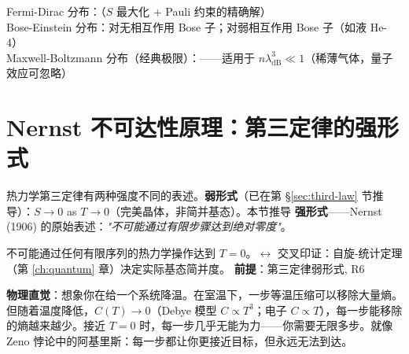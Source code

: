 \precisionbox[FD/BE 分布精度]
  Fermi-Dirac 分布：\precexact（$S$ 最大化 + Pauli 约束的精确解）\\
  Bose-Einstein 分布：\precexact 对无相互作用 Bose 子；\preceffective 对弱相互作用 Bose 子（如液 He-4）\\
  Maxwell-Boltzmann 分布（经典极限）：\precisionapprox——适用于 $n\lambda^3_{\text{dB}} \ll 1$（稀薄气体，量子效应可忽略）
\endprecisionbox

\section{Nernst 不可达性原理：第三定律的强形式}

热力学第三定律有两种强度不同的表述。\textbf{弱形式}（已在第 \S\ref{sec:third-law} 节推导）：$S \to 0$ as $T \to 0$（完美晶体，非简并基态）。本节推导 \textbf{强形式}——Nernst (1906) 的原始表述：\textit{"不可能通过有限步骤达到绝对零度"}。

\begin{lawbox}
  不可能通过任何有限序列的热力学操作达到 $T=0$。$\leftrightarrow$ 交叉印证：自旋-统计定理（第 \ref{ch:quantum} 章）决定实际基态简并度。
  \quad\textbf{前提}：第三定律弱形式, R6
\end{lawbox}

\noindent\textbf{物理直觉}：想象你在给一个系统降温。在室温下，一步等温压缩可以移除大量熵。但随着温度降低，$C(T) \to 0$（Debye 模型 $C \propto T^3$；电子 $C \propto T$），每一步能移除的熵越来越少。接近 $T=0$ 时，每一步几乎无能为力——你需要无限多步。就像 Zeno 悖论中的阿基里斯：每一步都让你更接近目标，但永远无法到达。

